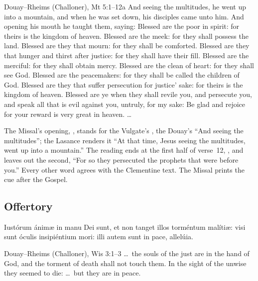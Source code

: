 \begin{englishwitness}{Douay--Rheims (Challoner), Mt 5:1--12a}
And seeing the multitudes, he went up into a mountain, and when he was set
down, his disciples came unto him. And opening his mouth he taught them,
saying: Blessed are the poor in spirit: for theirs is the kingdom of heaven.
Blessed are the meek: for they shall possess the land. Blessed are they that
mourn: for they shall be comforted. Blessed are they that hunger and thirst
after justice: for they shall have their fill. Blessed are the merciful: for
they shall obtain mercy. Blessed are the clean of heart: for they shall see
God. Blessed are the peacemakers: for they shall be called the children of
God. Blessed are they that suffer persecution for justice' sake: for theirs is
the kingdom of heaven. Blessed are ye when they shall revile you, and
persecute you, and speak all that is evil against you, untruly, for my sake:
Be glad and rejoice for your reward is very great in heaven. \dots
\end{englishwitness}

\noindent The Missal's opening, ,
stands for the Vulgate's , the Douay's ``And
seeing the multitudes''; the Lasance renders it ``At that time, Jesus seeing
the multitudes, went up into a mountain.'' The reading ends at the first half of
verse~12, , and leaves out the second, ``For so they
persecuted the prophets that were before you.'' Every other word agrees with
the Clementine text. The Missal prints the
cue  after the Gospel.

\subsection{Offertory}
\label{proper-offertory}


\begin{latinproper}
Iustórum ánimæ in manu Dei sunt, et non tanget illos torméntum malítiæ:
visi sunt óculis insipiéntium mori: illi autem sunt in pace, allelúia.
\end{latinproper}

\begin{englishwitness}{Douay--Rheims (Challoner), Wis 3:1--3}
\dots\ the souls of the just are in the hand of God, and the torment of death
shall not touch them. In the sight of the unwise they seemed to die: \dots\
but they are in peace.
\end{englishwitness}

